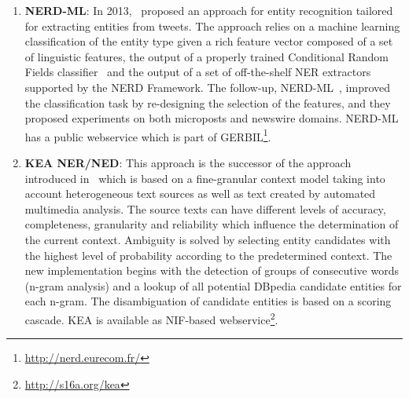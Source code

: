 \begin{enumerate}
\item \textbf{NERD-ML}: In 2013,~\cite{vanErp2013} proposed an approach for entity recognition tailored for extracting entities from tweets. The approach relies on a machine learning classification of the entity type given a rich feature vector composed of a set of linguistic features, the output of a properly trained Conditional Random Fields classifier~\cite{Lafferty:2001:CRF:645530.655813} and the output of a set of off-the-shelf NER extractors supported by the NERD Framework. The follow-up, NERD-ML~\cite{rizzo2014}, improved the classification task by re-designing the selection of the features, and they proposed experiments on both microposts and newswire domains.
NERD-ML has a public webservice which is part of GERBIL\footnote{\url{http://nerd.eurecom.fr/}}.


\item \textbf{KEA NER/NED}: This approach is the successor of the approach introduced in~\cite{Steinmetz2013} which is based on a fine-granular context model taking into account heterogeneous text sources %
as well as text created by automated multimedia analysis. %
The source texts can have different levels of accuracy, completeness, granularity and reliability which influence the determination of the current context. 
Ambiguity is solved by selecting entity candidates with the highest level of probability according to the predetermined context. 
The new implementation begins with the detection of groups of consecutive words (n-gram analysis) and a lookup of all potential DBpedia candidate entities for each n-gram. 
The disambiguation of candidate entities is based on a scoring cascade. %
KEA is available as NIF-based webservice\footnote{\url{http://s16a.org/kea}}.



\end{enumerate}
